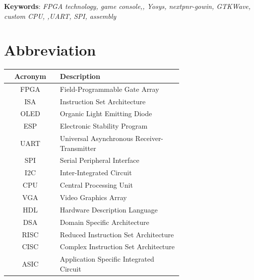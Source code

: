 \documentclass[a4paper,12pt]{article}
\begin{document}
    \noindent
    \textbf{Keywords}: \textit{FPGA technology, game console,, Yosys, nextpnr-gowin, GTKWave, custom CPU, ,UART, SPI, assembly}

    \newpage
    \tableofcontents


    \newpage
    \listoffigures
    \setcounter{page}{3}

    \newpage
    \listoftables
    \newpage


    \section*{Abbreviation} 
    \renewcommand{\arraystretch}{2.3}
    \label{tab:acronyms}
    \begin{tabular}{|c|p{0.7\linewidth}|}
    \hline
    \textbf{Acronym} & \textbf{Description} \\
    \hline
    FPGA & Field-Programmable Gate Array \\
    ISA & Instruction Set Architecture \\
    OLED & Organic Light Emitting Diode \\
    ESP & Electronic Stability Program \\
    UART & Universal Asynchronous Receiver-Transmitter \\
    SPI & Serial Peripheral Interface \\
    I2C & Inter-Integrated Circuit \\
    CPU & Central Processing Unit \\
    VGA & Video Graphics Array \\
    HDL & Hardware Description Language \\
    DSA & Domain Specific Architecture\\
    RISC & Reduced Instruction Set Architecture\\
    CISC & Complex Instruction Set Architecture\\
    ASIC & Application Specific Integrated Circuit\\
    \hline
    \end{tabular}

    \newpage
    \setcounter{page}{1}
\end{document}
